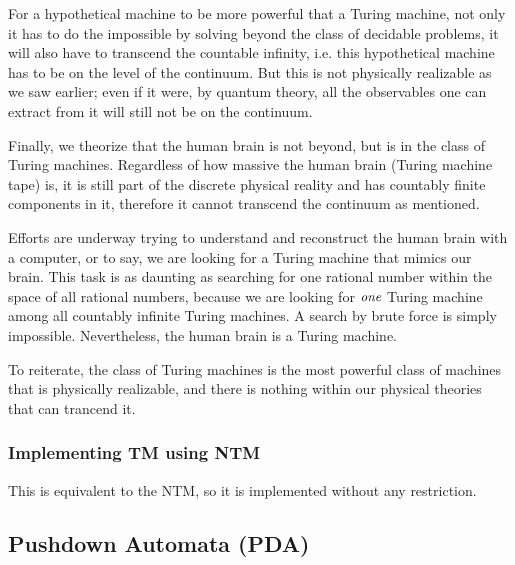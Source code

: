 \documentclass[12pt]{article}  %
\begin{document}
For a hypothetical machine to be more powerful that a Turing machine, not only it has to do the impossible by solving beyond the class of decidable problems, it will also have to transcend the countable infinity, i.e. this hypothetical machine has to be on the level of the continuum. But this is not physically realizable as we saw earlier; even if it were, by quantum theory, all the observables one can extract from it will still not be on the continuum.

Finally, we theorize that the human brain is not beyond, but is in the class of Turing machines. Regardless of how massive the human brain (Turing machine tape) is, it is still part of the discrete physical reality and has countably finite components in it, therefore it cannot transcend the continuum as mentioned.

Efforts are underway trying to understand and reconstruct the human brain with a computer, or to say, we are looking for a Turing machine that mimics our brain. This task is as daunting as searching for one rational number within the space of all rational numbers, because we are looking for $\emph{one}$ Turing machine among all countably infinite Turing machines. A search by brute force is simply impossible. Nevertheless, the human brain is a Turing machine.

To reiterate, the class of Turing machines is the most powerful class of machines that is physically realizable, and there is nothing within our physical theories that can trancend it.




\subsubsection{Implementing TM using NTM}
This is equivalent to the NTM, so it is implemented without any restriction.





\subsection{Pushdown Automata (PDA)}
\end{document}

